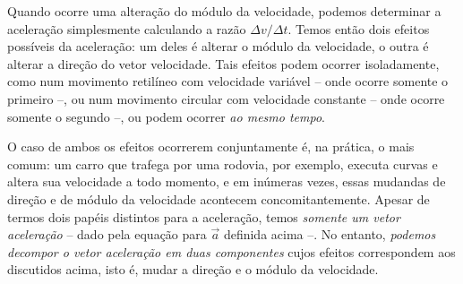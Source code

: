 Quando ocorre uma alteração do módulo da velocidade, podemos determinar a aceleração simplesmente calculando a razão $\Delta v/\Delta t$. Temos então dois efeitos possíveis da aceleração: um deles é alterar o módulo da velocidade, o outra é alterar a direção do vetor velocidade. Tais efeitos podem ocorrer isoladamente, como num movimento retilíneo com velocidade variável -- onde ocorre somente o primeiro --, ou num movimento circular com velocidade constante -- onde ocorre somente o segundo --, ou podem ocorrer \emph{ao mesmo tempo}.

O caso de ambos os efeitos ocorrerem conjuntamente é, na prática, o mais comum: um carro que trafega por uma rodovia, por exemplo, executa curvas e altera sua velocidade a todo momento, e em inúmeras vezes, essas mudandas de direção e de módulo da velocidade acontecem concomitantemente. Apesar de termos dois papéis distintos para a aceleração, temos \emph{somente um vetor aceleração} -- dado pela equação para $\vec{a}$ definida acima --. No entanto, \emph{podemos decompor o vetor aceleração em duas componentes} cujos efeitos correspondem aos discutidos acima, isto é, mudar a direção e o módulo da velocidade. 

